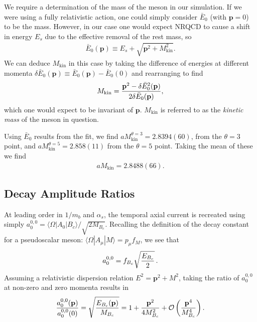 We require a determination of the mass of the meson in our simulation. If we were using a fully relativistic action, one could simply consider $\bar{E}_0$ (with ${\textbf{p}}=0$) to be the mass. However, in our case one would expect NRQCD to cause a shift in energy $E_s$ due to the effective removal of the rest mass, so
\begin{align}
 \bar{E}_0({\textbf{p}}) \equiv E_s + \sqrt{ {\textbf{p}}^2 + M_{\text{kin}}^2 }.
 \label{eq:euclidean_energy}
\end{align}
We can deduce $M_{\text{kin}}$ in this case by taking the difference of energies at different momenta $\delta \bar{E}_0({\textbf{p}}) \equiv \bar{E}_0({\textbf{p}}) - \bar{E}_0(0)$ and rearranging to find
\begin{align}
 M_{\text{kin}} = { {\textbf{p}}^2 - \delta \bar{E}_0^2({\textbf{p}}) \over 2\delta \bar{E}_0({\textbf{p}}) },
 \label{eq:kinetic_mass}
\end{align}
which one would expect to be invariant of ${\textbf{p}}$. $M_{\text{kin}}$ is referred to as the \textit{kinetic mass} of the meson in question.

Using $\bar{E}_0$ results from the fit, we find $aM_{\text{kin}}^{\theta=3} = 2.8394(60)$, from the $\theta=3$ point, and $aM_{\text{kin}}^{\theta=5} = 2.858(11)$ from the $\theta=5$ point. Taking the mean of these we find
\begin{align}
  aM_{\text{kin}} = 2.8488(66).
  \label{eq:kineticmass_Bc}
\end{align}

\subsection{Decay Amplitude Ratios}

At leading order in $1/m_b$ and $\alpha_s$, the temporal axial current is recreated using simply $a_0^{0,0} = \langle \Omega | A_0 | B_c \rangle /\sqrt{2M_{B_c}}$. Recalling the definition of the decay constant for a pseudoscalar meson: $\langle \Omega | A_{\mu} | M \rangle = p_{\mu} f_{M}$, we see that
\begin{align}
  a_0^{0,0} = f_{B_c}\sqrt{ E_{B_c} \over 2 }\,.
\end{align}
Assuming a relativistic dispersion relation $E^2={\textbf{p}}^2+M^2$, taking the ratio of $a_0^{0,0}$ at non-zero and zero momenta results in
\begin{align}
  {a_0^{0,0}({\textbf{p}})\over a_0^{0,0}(0)} = \sqrt{ E_{B_c}({\textbf{p}})\over M_{B_c}} = 1 + {{\textbf{p}}^2\over 4M_{B_c}^2} + \mathcal{O}\left( {\textbf{p}}^4\over M_{B_c}^4 \right).
\end{align}

